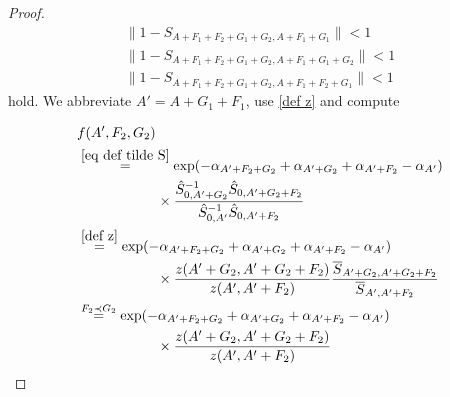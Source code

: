 \documentclass[b5paper,draft,openbib,12pt]{memoir}
\begin{document}
\begin{proof}
 \begin{align}
 \|1-S_{A+F_1+F_2+G_1+G_2,A+F_1+G_1}\|<1\\
 \|1-S_{A+F_1+F_2+G_1+G_2,A+F_1+G_1+G_2}\|<1\\
 \|1-S_{A+F_1+F_2+G_1+G_2,A+F_1+F_2+G_1}\|<1
 \end{align} 
 hold. We abbreviate \(A'=A+G_1+F_1\), use \eqref{def z} and compute
 
 \begin{align}\notag
 &f(A',F_2,G_2)\\\notag
 &\overset{\eqref{eq def tilde S}}{=}
 \exp(-\alpha_{A'+F_2+G_2}+\alpha_{A'+G_2}+\alpha_{A'+F_2}-\alpha_{A'})\\
 &\hspace{2cm}\times\frac{\hat{S}_{0,A'+G_2}^{-1}\hat{S}_{0,A'+G_2+F_2}}{\hat{S}_{0,A'}^{-1}\hat{S}_{0,A'+F_2}}
 \\\notag
 &\overset{\eqref{def z}}{=}
 \exp(-\alpha_{A'+F_2+G_2}+\alpha_{A'+G_2}+\alpha_{A'+F_2}-\alpha_{A'})\\
 &\hspace{2cm}\times \frac{z(A'+G_2,A'+G_2+F_2) }{z(A',A'+F_2)} \frac{\overline{S}_{A'+G_2,A'+G_2+F_2}}{\overline{S}_{A',A'+F_2}}\\\notag
 &\overset{F_2\prec G_2 }{=}\exp(-\alpha_{A'+F_2+G_2}+\alpha_{A'+G_2}+\alpha_{A'+F_2}-\alpha_{A'})\\
 &\hspace{2cm}\times \frac{z(A'+G_2,A'+G_2+F_2) }{z(A',A'+F_2)}
 \end{align}


\end{proof}
\end{document}
